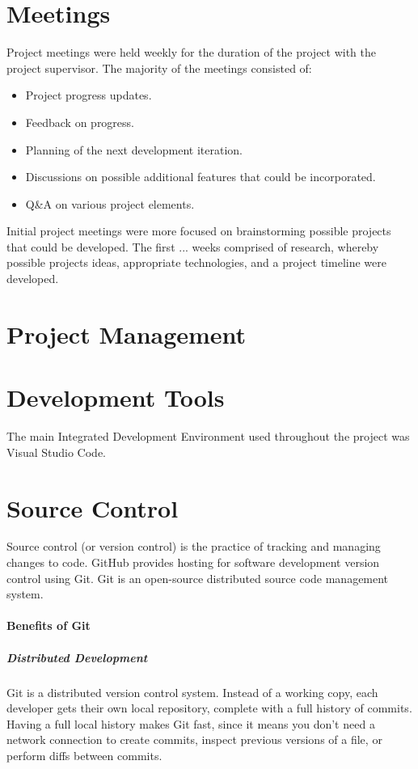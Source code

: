 \section{Meetings}
Project meetings were held weekly for the duration of the project with the project supervisor. The majority of the meetings consisted of:
\begin{itemize}
    \item Project progress updates.
    \item Feedback on progress.
    \item Planning of the next development iteration.
    \item Discussions on possible additional features that could be incorporated.
    \item Q&A on various project elements.
\end{itemize}
\par
\medskip
Initial project meetings were more focused on brainstorming possible projects that could be developed. The first ... weeks comprised of research, whereby possible projects ideas, appropriate technologies, and a project timeline were developed.

\section{Project Management}

\section{Development Tools}
The main Integrated Development Environment used throughout the project was Visual Studio Code.

\section{Source Control}
Source control (or version control) is the practice of tracking and managing changes to code. GitHub provides hosting for software development version control using Git. Git is an open-source distributed source code management system.

\paragraph{Benefits of Git}
\subparagraph{Distributed Development}
Git is a distributed version control system. Instead of a working copy, each developer gets their own local repository, complete with a full history of commits. Having a full local history makes Git fast, since it means you don’t need a network connection to create commits, inspect previous versions of a file, or perform diffs between commits.

